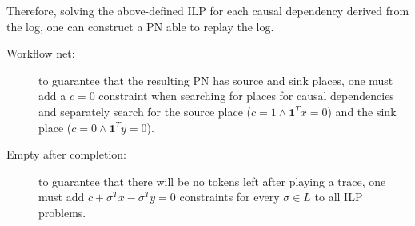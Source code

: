 \documentclass[a4paper]{report}
\begin{document}
Therefore, solving the above-defined ILP for each causal dependency derived from the log, one can construct a PN able to replay the log.

\begin{description}
    \item[Workflow net:] to guarantee that the resulting PN has source and sink places, one must add a $c=0$ constraint when searching for places for causal dependencies and separately search for the source place ($c=1 \land \bm{1}^{T}x=0$) and the sink place ($c=0 \land \bm{1}^{T}y=0$).
    \item[Empty after completion:] to guarantee that there will be no tokens left after playing a trace, one must add $c+\sigma^{T}x - \sigma^{T}y=0$ constraints for every $\sigma \in L$ to all ILP problems.
\end{description}
\end{document}
